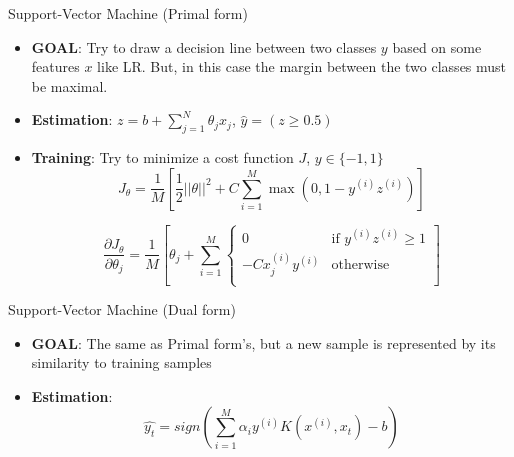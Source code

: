 \documentclass{KBook}
\begin{document}
	Support-Vector Machine (Primal form)
	
	\begin{minipage}{0.75\textwidth} 
		\begin{itemize}
			\item \textbf{GOAL}: Try to draw a decision line between two classes $ y $ based on some features $ x $ like LR. But, in this case the margin between the two classes must be maximal.
			\item \textbf{Estimation}: $ z = b + \sum_{j=1}^{N} \theta_j x_j $, 
			$ \hat{y} = (z \ge 0.5)$
		\end{itemize}
	\end{minipage}
	\begin{minipage}{0.24\textwidth} 
	\end{minipage}
	
	\begin{itemize}
		\item \textbf{Training}: Try to minimize a cost function $ J $, $ y \in \{-1, 1\} $
		\[J_\theta = \frac{1}{M} \left[ \frac{1}{2}||\theta||^2 + C \sum\limits_{i=1}^{M} \max (0, 1 - y^{(i)} z^{(i)}) \right]
		\]
		
		\[\frac{\partial J_\theta}{\partial \theta_{j}} = \frac{1}{M} \left[ \theta_j + \sum\limits_{i=1}^{M} \begin{cases}
			0 & \text{if } y^{(i)} z^{(i)} \ge 1\\
			- C x^{(i)}_j y^{(i)} & \text{otherwise}  \\
		\end{cases} \right]
		\]
	\end{itemize}
	
	Support-Vector Machine (Dual form)
	
	\begin{minipage}{0.75\textwidth} 
		\begin{itemize}
			\item \textbf{GOAL}: The same as Primal form's, but a new sample is represented by its similarity to training samples
			\item \textbf{Estimation}: 
			\[\hat{y_t} = sign(\sum^M_{i=1} \alpha_i y^{(i)} K(x^{(i)}, x_t) - b)\]
		\end{itemize}
	\end{minipage}
	\begin{minipage}{0.24\textwidth} 
	\end{minipage}
	
\end{document}
